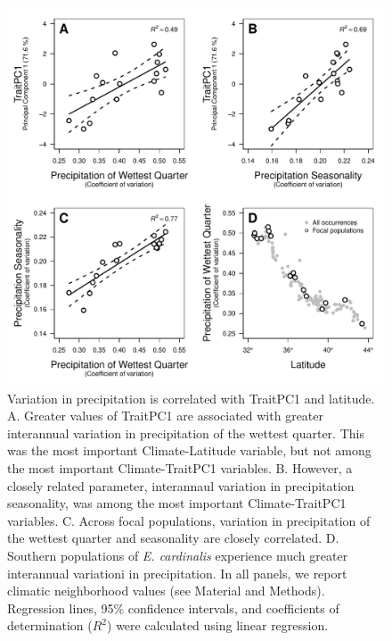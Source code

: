 \documentclass[11pt, oneside]{article}
\begin{document}
\begin{figure}[h!]
	\centerline{\includegraphics[width=1\textwidth]{Figures/Figure_ClimPC1.pdf}}
	\fontsize{10}{12}
	\selectfont
	\caption[Variation in precipitation is correlated with TraitPC1 and latitude]{Variation in precipitation is correlated with TraitPC1 and latitude. A. Greater values of TraitPC1 are associated with greater interannual variation in precipitation of the wettest quarter. This was the most important Climate-Latitude variable, but not among the most important Climate-TraitPC1 variables. B. However, a closely related parameter, interannaul variation in precipitation seasonality, was among the most important Climate-TraitPC1 variables. C. Across focal populations, variation in precipitation of the wettest quarter and seasonality are closely correlated. D. Southern populations of \textit{E. cardinalis} experience much greater interannual variationi in precipitation. In all panels, we report climatic neighborhood values (see Material and Methods). Regression lines, 95\% confidence intervals, and coefficients of determination ($R^2$) were calculated using linear regression.}
	\label{fig:Fig_ClimPC1}
\end{figure}

\end{document}

